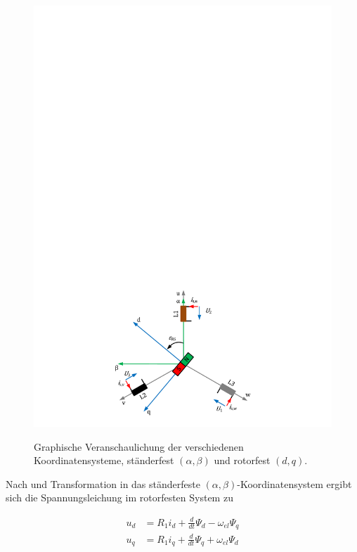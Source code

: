 \begin{figure}
\centering
\includegraphics[width=\columnwidth]{img/synchron-grundlage}
\label{fig:synchron-grundlage}
\caption{Graphische Veranschaulichung der verschiedenen Koordinatensysteme, ständerfest $(\alpha, \beta)$ und rotorfest $(d, q)$.}
\end{figure}

Nach \textcite{ternesfeldkamp} und Transformation in das ständerfeste $(\alpha, \beta)$-Koordinatensystem ergibt sich die Spannungsleichung im rotorfesten System zu

\begin{align}
u_d &= R_1 i_d + \frac{d}{dt}\Psi_d - \omega_{el} \Psi_q \label{eqn:ud} \\ 
u_q &= R_1 i_q + \frac{d}{dt}\Psi_q + \omega_{el} \Psi_d \label{eqn:uq}
\end{align}

